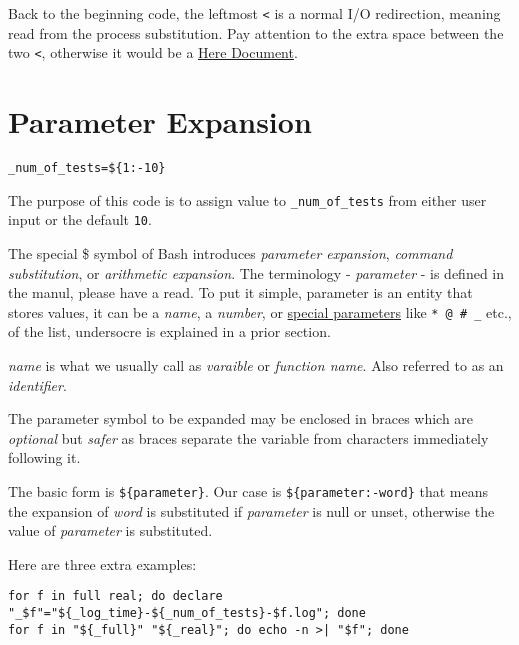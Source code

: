 Back to the beginning code, the leftmost \verb|<| is a normal I/O
redirection, meaning read from the process substitution. Pay
attention to the extra space between the two \verb|<|, otherwise
it would be a
\href{https://www.gnu.org/software/bash/manual/bash.html#Here-Documents}{Here
  Document}.

\section{Parameter Expansion}
\label{sec:bash-parameter-expansion}

\begin{lstlisting}
_num_of_tests=${1:-10}
\end{lstlisting}

The purpose of this code is to assign value to
\verb|_num_of_tests| from either user input or the default
\verb|10|.

The special \$ symbol of Bash introduces \textit{parameter
  expansion}, \textit{command substitution}, or \textit{arithmetic
  expansion}. The terminology - \textit{parameter} - is defined in
the manul, please have a read. To put it simple, parameter is an
entity that stores values, it can be a \textit{name}, a
\textit{number}, or
\href{https://www.gnu.org/software/bash/manual/bash.html#Special-Parameters}{special
  parameters} like \verb|* @ # _| etc., of the list, undersocre is
explained in a prior section.

\textit{name} is what we usually call as \textit{varaible} or
\textit{function name}. Also referred to as an
\textit{identifier}.

The parameter symbol to be expanded may be enclosed in braces
which are \textit{optional} but \textit{safer} as braces separate
the variable from characters immediately following it.

The basic form is
\lstinline|${parameter}|. Our case is
\lstinline|${parameter:-word}| that means the expansion of
\textit{word} is substituted if \textit{parameter} is null or
unset, otherwise the value of \textit{parameter} is substituted.

Here are three extra examples:

\begin{minipage}{1.0\linewidth}
\begin{lstlisting}
for f in full real; do declare "_$f"="${_log_time}-${_num_of_tests}-$f.log"; done
for f in "${_full}" "${_real}"; do echo -n >| "$f"; done  
\end{lstlisting}
\end{minipage}

